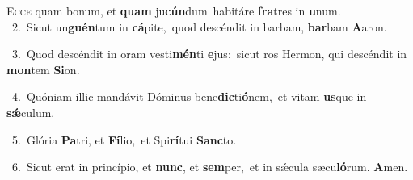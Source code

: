 \lettrine{\initial\textcolor{\initialcolor}{E}}{cce} quam bonum, et \textbf{quam} ju\-\textbf{cún}\-dum~\star habitáre \textbf{fra}\-tres in \textbf{u}\-num.\\
{\numbfont\textcolor{\numbcolor}{~2.}}~Sicut un\-\textbf{guén}\-tum in \textbf{cá}\-pite,~\star quod descéndit in barbam, \textbf{bar}\-bam \textbf{A}\-aron.\par
{\numbfont\textcolor{\numbcolor}{~3.}}~Quod descéndit in oram vesti\-\textbf{mén}\-ti \textbf{e}\-jus:~\star sicut ros Hermon, qui descéndit in \textbf{mon}\-tem \textbf{Si}\-on.\par
{\numbfont\textcolor{\numbcolor}{~4.}}~Quóniam illic mandávit Dóminus bene\-\textbf{dic}\-ti\-\textbf{ó}\-nem,~\star et vitam \textbf{us}\-que in \textbf{sǽ}\-culum.\par
{\numbfont\textcolor{\numbcolor}{~5.}}~Glória \textbf{Pa}\-tri, et \textbf{Fí}\-lio,~\star et Spi\-\textbf{rí}\-tui \textbf{Sanc}\-to.\par
{\numbfont\textcolor{\numbcolor}{~6.}}~Sicut erat in princípio, et \textbf{nunc}\-, et \textbf{sem}\-per,~\star et in sǽcula sæcu\-\textbf{ló}\-rum. \textbf{A}\-men.\par
